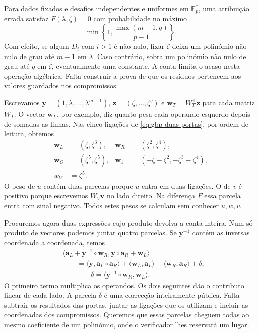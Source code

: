 Para dados fixados e desafios independentes e uniformes em
\(\mathbb F_p^*\), uma atribuição errada satisfaz
\(F(\lambda,\zeta)=0\) com probabilidade no máximo
\[
 \min\!\left\{1,\frac{\max(m-1,q)}{p-1}\right\}.
\]
Com efeito, se algum \(D_i\) com \(i>1\) é não nulo, fixar \(\zeta\)
deixa um polinómio não nulo de grau até \(m-1\) em \(\lambda\). Caso
contrário, sobra um polinómio não nulo de grau até \(q\) em \(\zeta\),
eventualmente uma constante. A conta limita o acaso nesta operação
algébrica. Falta construir a prova de que os resíduos pertencem aos
valores guardados nos compromissos.

Escrevamos \(\boldsymbol y=(1,\lambda,\ldots,\lambda^{m-1})\),
\(\boldsymbol z=(\zeta,\ldots,\zeta^q)\) e
\(\boldsymbol w_T=W_T^\top\boldsymbol z\) para cada matriz
\(W_T\). O vector \(\boldsymbol w_L\), por exemplo, diz quanto pesa
cada operando esquerdo depois de somadas as linhas. Nas cinco ligações
de \eqref{eq:gbp-duas-portas}, por ordem de leitura, obtemos
\[
 \begin{aligned}
 \boldsymbol w_L&=(\zeta,\zeta^3),&
 \boldsymbol w_R&=(\zeta^2,\zeta^4),\\
 \boldsymbol w_O&=(\zeta^5,\zeta^5),&
 \boldsymbol w_1&=(-\zeta-\zeta^2,-\zeta^3-\zeta^4),\\
 w_V&=\zeta^5 .
 \end{aligned}
\]
O peso de \(u\) contém duas parcelas porque \(u\) entra em duas ligações.
O de \(v\) é positivo porque escrevemos \(W_V\boldsymbol v\) no lado
direito. Na diferença \(F\) essa parcela entra com sinal negativo.
Todos estes pesos se calculam sem conhecer \(u,w,v\).

Procuremos agora duas expressões cujo produto devolva a conta inteira.
Num só produto de vectores podemos juntar quatro parcelas. Se
\(\boldsymbol y^{-1}\) contém as inversas coordenada a coordenada,
temos
\begin{align*}
 &\langle\boldsymbol a_L+\boldsymbol y^{-1}\circ\boldsymbol w_R,
           \boldsymbol y\circ\boldsymbol a_R+\boldsymbol w_L\rangle\\
 &\qquad=\langle\boldsymbol y,\boldsymbol a_L\circ\boldsymbol a_R\rangle
          +\langle\boldsymbol w_L,\boldsymbol a_L\rangle
          +\langle\boldsymbol w_R,\boldsymbol a_R\rangle+\delta,\\
 &\hspace{4em}\delta=\langle\boldsymbol y^{-1}\circ\boldsymbol w_R,
                               \boldsymbol w_L\rangle .
\end{align*}
O primeiro termo multiplica os operandos. Os dois seguintes dão o
contributo linear de cada lado. A parcela \(\delta\) é uma correcção
inteiramente pública. Falta subtrair os resultados das portas, juntar
as ligações que os utilizam e incluir as coordenadas dos compromissos.
Queremos que essas parcelas cheguem todas ao mesmo coeficiente de um
polinómio, onde o verificador lhes reservará um lugar.

